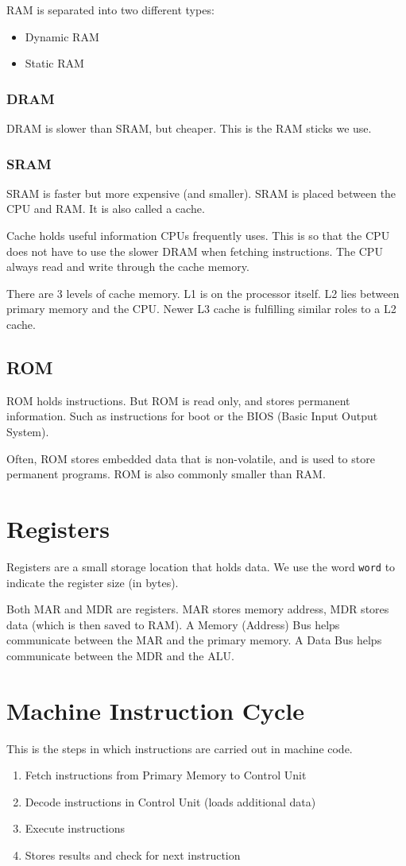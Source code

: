 \documentclass[../notes.tex]{subfiles}
\begin{document}
RAM is separated into two different types: 
\begin{itemize}
	\item Dynamic RAM
	\item Static RAM
\end{itemize}

\subsubsection{DRAM}
DRAM is slower than SRAM, but cheaper.
This is the RAM sticks we use.

\subsubsection{SRAM}
SRAM is faster but more expensive (and smaller). 
SRAM is placed between the CPU and RAM.
It is also called a cache.

Cache holds useful information CPUs frequently uses.
This is so that the CPU does not have to use the slower DRAM when fetching instructions.
The CPU always read and write through the cache memory.

There are 3 levels of cache memory.
L1 is on the processor itself.
L2 lies between primary memory and the CPU.
Newer L3 cache is fulfilling similar roles to a L2 cache.

\subsection{ROM}
ROM holds instructions.
But ROM is read only, and stores permanent information.
Such as instructions for boot or the BIOS (Basic Input Output System).

Often, ROM stores embedded data that is non-volatile, and is used to store permanent programs.
ROM is also commonly smaller than RAM.

\section{Registers}
Registers are a small storage location that holds data.
We use the word \texttt{word} to indicate the register size (in bytes).

Both MAR and MDR are registers.
MAR stores memory address, MDR stores data (which is then saved to RAM).
A Memory (Address) Bus helps communicate between the MAR and the primary memory.
A Data Bus helps communicate between the MDR and the ALU.

\section{Machine Instruction Cycle}
This is the steps in which instructions are carried out in machine code.
\begin{enumerate}
	\item Fetch instructions from Primary Memory to Control Unit
	\item Decode instructions in Control Unit (loads additional data)
	\item Execute instructions
	\item Stores results and check for next instruction
\end{enumerate}
\end{document}
